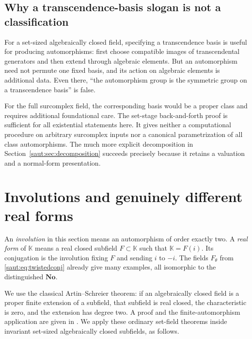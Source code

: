 \documentclass[11pt]{article}
\theoremstyle{definition}
\theoremstyle{remark}
\newcommand{\No}{\mathbf{No}}
\newcommand{\K}{\mathbb K}
\numberwithin{equation}{section}
\begin{document}
\subsection{Why a transcendence-basis slogan is not a classification}

For a set-sized algebraically closed field, specifying a transcendence
basis is useful for producing automorphisms: first choose compatible images
of transcendental generators and then extend through algebraic elements.
But an automorphism need not permute one fixed basis, and its action on
algebraic elements is additional data. Even there, ``the automorphism group
is the symmetric group on a transcendence basis'' is false.

For the full surcomplex field, the corresponding basis would be a proper
class and requires additional foundational care. The set-stage
back-and-forth proof is sufficient for all existential statements here.
It gives neither a computational procedure on arbitrary surcomplex inputs
nor a canonical parametrization of all class automorphisms. The much more
explicit decomposition in Section~\ref{saut:sec:decomposition} succeeds precisely
because it retains a valuation and a normal-form presentation.

\section{Involutions and genuinely different real forms}\label{saut:sec:realforms}

An \emph{involution} in this section means an automorphism of order exactly
two. A \emph{real form} of $\K$ means a real closed subfield $F\subset\K$
such that $\K=F(i)$. Its conjugation is the involution fixing $F$ and sending
$i$ to $-i$. The fields $F_\theta$ from \eqref{saut:eq:twistedconj} already give
many examples, all isomorphic to the distinguished $\No$.

We use the classical Artin--Schreier theorem: if an algebraically closed
field is a proper finite extension of a subfield, that subfield is real
closed, the characteristic is zero, and the extension has degree two.
A proof and the finite-automorphism application are given in \cite{Conrad}.
We apply these ordinary set-field theorems inside invariant set-sized
algebraically closed subfields, as follows.
\end{document}
